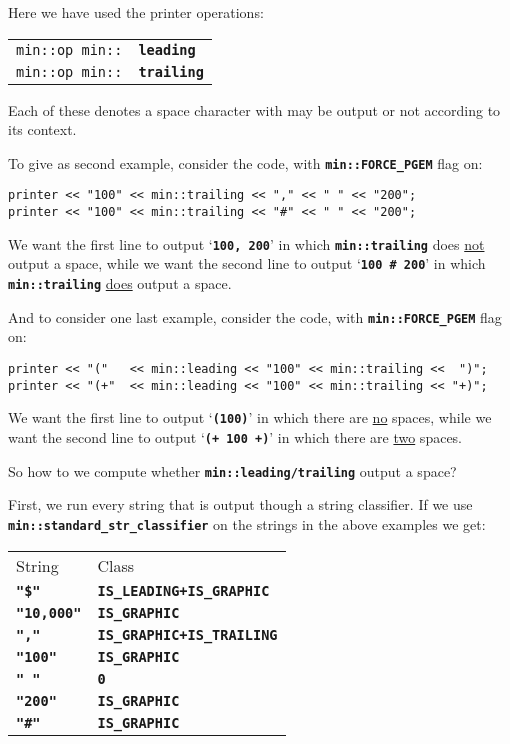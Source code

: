 \documentclass[12pt]{article}
\makeatletter
\newcommand{\TT}[1]{{\tt \bfseries #1}}
\newcommand{\ttindex}[1]{\index{#1@{\tt #1}}}
\newcommand{\EOL}{\penalty \exhyphenpenalty}
\newenvironment{indpar}[1][0.3in]%
	{\begin{list}{}%
		     {\setlength{\itemsep}{0in}%
		      \setlength{\topsep}{0in}%
		      \setlength{\parsep}{1ex}%
		      \setlength{\labelwidth}{#1}%
		      \setlength{\leftmargin}{#1}%
		      \addtolength{\leftmargin}{\labelsep}}%
	 \item}%
	{\end{list}}
\newcommand{\LABEL}[1]{\label{#1}}
\newcommand{\MINKEY}[1]%
	   {\TT{#1}\ttindex{min::#1}\ttindex{#1}}
\makeatother
\begin{document}
Here we have used the printer operations:

\begin{indpar}[1em]\begin{tabular}{r@{}l}
\verb|min::op min::| & \MINKEY{leading}
\LABEL{MIN::LEADING} \\
\verb|min::op min::| & \MINKEY{trailing}
\LABEL{MIN::TRAILING} \\
\end{tabular}\end{indpar}

Each of these denotes a space character with may be output or
not according to its context.

To give as second example,
consider the code, with \TT{min::\EOL FORCE\_\EOL PGEM} flag on:
\begin{indpar}\begin{verbatim}
printer << "100" << min::trailing << "," << " " << "200";
printer << "100" << min::trailing << "#" << " " << "200";
\end{verbatim}\end{indpar}

We want the first line to output `\TT{100, 200}' in which
\TT{min::\EOL trailing} does \underline{not} output a space,
while we want the second line to output `\TT{100 \# 200}'
in which \TT{min::\EOL trailing} \underline{does} output a space.

And to consider one last example,
consider the code, with \TT{min::\EOL FORCE\_\EOL PGEM} flag on:
\begin{indpar}\begin{verbatim}
printer << "("   << min::leading << "100" << min::trailing <<  ")";
printer << "(+"  << min::leading << "100" << min::trailing << "+)";
\end{verbatim}\end{indpar}

We want the first line to output `\TT{(100)}' in which there are
\underline{no} spaces,
while we want the second line to output `\TT{(+ 100 +)}'
in which there are \underline{two} spaces.

So how to we compute whether \TT{min::leading/trailing} output
a space? 

First, we run every string that is output though a string classifier.
If we use \TT{min::\EOL standard\_\EOL str\_\EOL classifier} on the
strings in the above examples we get:

\begin{center}
\begin{tabular}{l@{~~~~~}l}
String & Class \\[2ex]
\TT{"\$"} & \TT{IS\_LEADING+IS\_GRAPHIC} \\
\TT{"10,000"} & \TT{IS\_GRAPHIC} \\
\TT{","} & \TT{IS\_GRAPHIC+IS\_TRAILING} \\
\TT{"100"} & \TT{IS\_GRAPHIC} \\
\TT{"~"} & \TT{0} \\
\TT{"200"} & \TT{IS\_GRAPHIC} \\
\TT{"\#"} & \TT{IS\_GRAPHIC} \\
\end{tabular}
\end{center}
\end{document}
